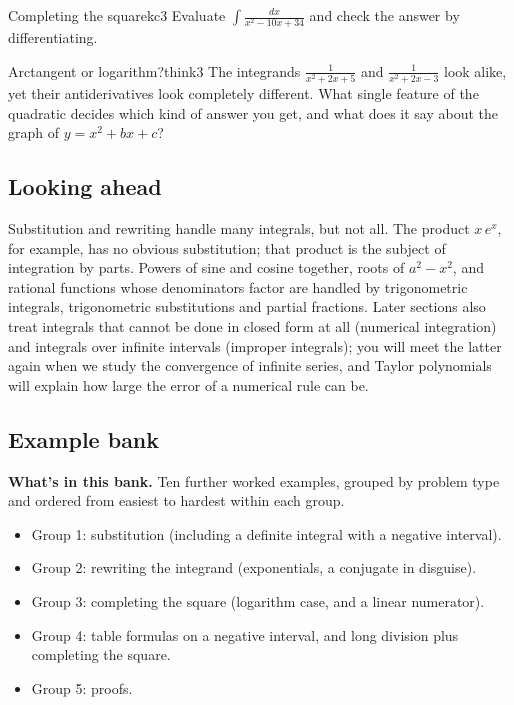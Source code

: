 \documentclass[11pt]{article}
\begin{document}
\begin{kc}{Completing the square}{kc3}
Evaluate $\int\frac{dx}{x^2-10x+34}$ and check the answer by differentiating.
\end{kc}

\begin{think}{Arctangent or logarithm?}{think3}
The integrands $\frac1{x^2+2x+5}$ and $\frac1{x^2+2x-3}$ look alike, yet their antiderivatives look completely different. What single feature of the quadratic decides which kind of answer you get, and what does it say about the graph of $y=x^2+bx+c$?
\end{think}

\subsection*{Looking ahead}

Substitution and rewriting handle many integrals, but not all. The product $x\,e^x$, for example, has no obvious substitution; that product is the subject of integration by parts. Powers of sine and cosine together, roots of $a^2-x^2$, and rational functions whose denominators factor are handled by trigonometric integrals, trigonometric substitutions and partial fractions. Later sections also treat integrals that cannot be done in closed form at all (numerical integration) and integrals over infinite intervals (improper integrals); you will meet the latter again when we study the convergence of infinite series, and Taylor polynomials will explain how large the error of a numerical rule can be.

\subsection*{Example bank}

\textbf{What's in this bank.} Ten further worked examples, grouped by problem type and ordered from easiest to hardest within each group.
\begin{itemize}[nosep]
  \item Group 1: substitution (including a definite integral with a negative interval).
  \item Group 2: rewriting the integrand (exponentials, a conjugate in disguise).
  \item Group 3: completing the square (logarithm case, and a linear numerator).
  \item Group 4: table formulas on a negative interval, and long division plus completing the square.
  \item Group 5: proofs.
\end{itemize}
\end{document}
